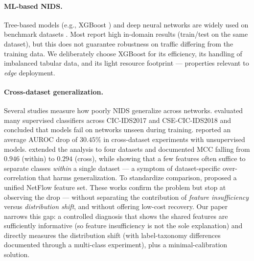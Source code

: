 \documentclass[preprint,12pt,authoryear]{elsarticle}
\begin{document}
\paragraph{ML-based NIDS.} Tree-based models (e.g., XGBoost
\citep{xgboost,husain,zhou}) and deep neural networks
\citep{shone,liulang,mahdavifar,wu,duan} are widely used on benchmark datasets
\citep{unsw,cicids}. Most report high in-domain results (train/test on the same
dataset), but this does not guarantee robustness on traffic differing from the
training data. We deliberately choose XGBoost for its efficiency, its handling of
imbalanced tabular data, and its light resource footprint --- properties relevant
to \emph{edge} deployment.

\paragraph{Cross-dataset generalization.} Several studies measure how poorly NIDS
generalize across networks. \citet{dhooge} evaluated many supervised classifiers
across CIC-IDS2017 and CSE-CIC-IDS2018 and concluded that models fail on networks
unseen during training. \citet{verkerken} reported an average AUROC drop of
$30.45\%$ in cross-dataset experiments with unsupervised models. \citet{cantone}
extended the analysis to four datasets and documented MCC falling from $0.946$
(within) to $0.294$ (cross), while showing that a few features often suffice to
separate classes \emph{within} a single dataset --- a symptom of dataset-specific
over-correlation that harms generalization. To standardize comparison,
\citet{sarhan,sarhannf} proposed a unified NetFlow feature set. These works confirm
the problem but stop at observing the drop --- without separating the contribution
of \emph{feature insufficiency} versus \emph{distribution shift}, and without
offering low-cost recovery. Our paper narrows this gap: a controlled diagnosis that
shows the shared features are sufficiently informative (so feature insufficiency is
not the sole explanation) and directly measures the distribution shift (with
label-taxonomy differences documented through a multi-class experiment), plus a
minimal-calibration solution.
\end{document}
